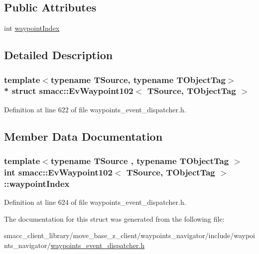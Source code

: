 \subsection*{Public Attributes}
\begin{DoxyCompactItemize}
\item 
int \hyperlink{structsmacc_1_1EvWaypoint102_a8982cf44ec274b3ad93f3d7e57c70463}{waypoint\+Index}
\end{DoxyCompactItemize}


\subsection{Detailed Description}
\subsubsection*{template$<$typename T\+Source, typename T\+Object\+Tag$>$\\*
struct smacc\+::\+Ev\+Waypoint102$<$ T\+Source, T\+Object\+Tag $>$}



Definition at line 622 of file waypoints\+\_\+event\+\_\+dispatcher.\+h.



\subsection{Member Data Documentation}
\subsubsection[{\texorpdfstring{waypoint\+Index}{waypointIndex}}]{\setlength{\rightskip}{0pt plus 5cm}template$<$typename T\+Source , typename T\+Object\+Tag $>$ int {\bf smacc\+::\+Ev\+Waypoint102}$<$ T\+Source, T\+Object\+Tag $>$\+::waypoint\+Index}\hypertarget{structsmacc_1_1EvWaypoint102_a8982cf44ec274b3ad93f3d7e57c70463}{}\label{structsmacc_1_1EvWaypoint102_a8982cf44ec274b3ad93f3d7e57c70463}


Definition at line 624 of file waypoints\+\_\+event\+\_\+dispatcher.\+h.



The documentation for this struct was generated from the following file\+:\begin{DoxyCompactItemize}
\item 
smacc\+\_\+client\+\_\+library/move\+\_\+base\+\_\+z\+\_\+client/waypoints\+\_\+navigator/include/waypoints\+\_\+navigator/\hyperlink{waypoints__event__dispatcher_8h}{waypoints\+\_\+event\+\_\+dispatcher.\+h}\end{DoxyCompactItemize}
